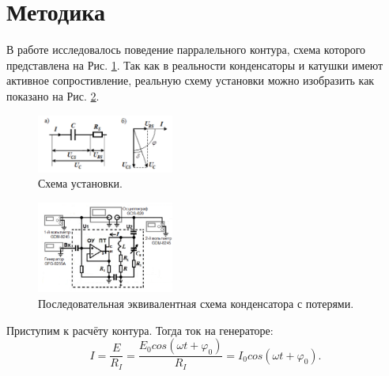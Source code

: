 \documentclass[12pt]{article}
\begin{document}
\section{Методика}
В работе исследовалось поведение парралельного контура, схема которого представлена на Рис. \ref{pic:scheme}. 
Так как в реальности конденсаторы и катушки имеют активное сопростивление, реальную схему установки можно изобразить как показано 
на Рис. \ref{pic:scheme2}.

\begin{figure}[H]
    \centering
    \includegraphics[width=0.4\textwidth]{im1.png}
    \caption{Схема установки.}
    \label{pic:scheme}
\end{figure}

\begin{figure}[H]
    \centering
    \includegraphics[width=0.4\textwidth]{im2.png}
    \caption{Последовательная эквивалентная схема конденсатора с потерями.}
    \label{pic:scheme2}
\end{figure}

Приступим к расчёту контура. Тогда ток на генераторе:
\[
    I=\dfrac{E}{R_I}=\dfrac{E_0cos(\omega t+\varphi_0)}{R_I}=I_0cos(\omega t+\varphi_0).
\]
\end{document}
